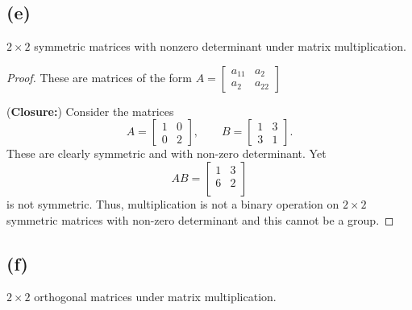 \documentclass{article}
\begin{document}
\subsection*{(e)}
$2\times 2$ symmetric matrices with nonzero determinant under matrix multiplication.

\begin{proof}
    These are matrices of the form $A = \begin{bmatrix}
            a_{11} & a_{2}  \\
            a_2    & a_{22}
        \end{bmatrix}$

    (\textbf{Closure:})
    Consider the matrices
    \begin{equation*}
        A = \begin{bmatrix}
            1 & 0 \\
            0 & 2
        \end{bmatrix}, \qquad
        B = \begin{bmatrix}
            1 & 3 \\
            3 & 1
        \end{bmatrix}.
    \end{equation*}
    These are clearly symmetric and with non-zero determinant. Yet
    \begin{equation*}
        AB = \begin{bmatrix}
            1 & 3 \\
            6 & 2 \\
        \end{bmatrix}
    \end{equation*}
    is not symmetric. Thus, multiplication is not a binary operation on
    $2 \times 2$ symmetric matrices with non-zero determinant and this
    cannot be a group.
\end{proof}

\subsection*{(f)}
$2 \times 2$ orthogonal matrices under matrix multiplication.
\end{document}
